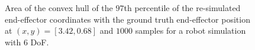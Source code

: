 \documentclass[conference]{IEEEtran}
\begin{document}
\begin{figure}[tbh]
\centering

    \caption{Area of the convex hull of the \(97\)th percentile of the re-simulated end-effector coordinates with the ground truth end-effector position at $(x, y) = [3.42, 0.68]$ and $1000$ samples for a robot simulation with 6 DoF.}
    \label{fig:q_quantile:6DOF}
\end{figure}
\end{document}
